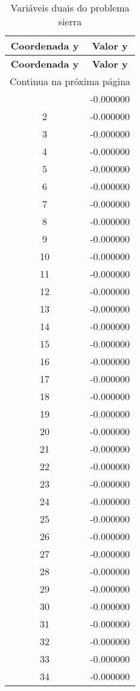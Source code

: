 \documentclass[12pt]{article}
\begin{document}
\begin{longtable}{@{}cc@{}}
\caption{Variáveis duais do problema sierra} \\
\toprule
\textbf{Coordenada y} & \textbf{Valor y} \\
\midrule
\endfirsthead

\toprule
\textbf{Coordenada y} & \textbf{Valor y} \\
\midrule
\endhead

\midrule \multicolumn{2}{r}{{Continua na próxima página}} \\ \midrule
\endfoot

\bottomrule
\endlastfoot
1 & -0.000000 \\
2 & -0.000000 \\
3 & -0.000000 \\
4 & -0.000000 \\
5 & -0.000000 \\
6 & -0.000000 \\
7 & -0.000000 \\
8 & -0.000000 \\
9 & -0.000000 \\
10 & -0.000000 \\
11 & -0.000000 \\
12 & -0.000000 \\
13 & -0.000000 \\
14 & -0.000000 \\
15 & -0.000000 \\
16 & -0.000000 \\
17 & -0.000000 \\
18 & -0.000000 \\
19 & -0.000000 \\
20 & -0.000000 \\
21 & -0.000000 \\
22 & -0.000000 \\
23 & -0.000000 \\
24 & -0.000000 \\
25 & -0.000000 \\
26 & -0.000000 \\
27 & -0.000000 \\
28 & -0.000000 \\
29 & -0.000000 \\
30 & -0.000000 \\
31 & -0.000000 \\
32 & -0.000000 \\
33 & -0.000000 \\
34 & -0.000000 \\

\end{longtable}
\end{document}
